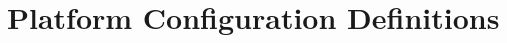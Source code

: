 \hypertarget{group___s_d___platform___conf___defines}{}\section{Platform Configuration Definitions}
\label{group___s_d___platform___conf___defines}
